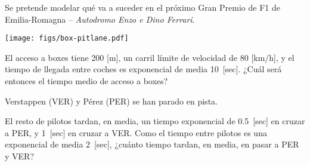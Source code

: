 \documentclass{upmassignment}
\date{\today}
\begin{document}
Se pretende modelar qué va a suceder en
el próximo Gran Premio de F1 de
Emilia-Romagna --
\textit{Autodromo Enzo e Dino Ferrari}.

\vspace{1em}

\begin{minipage}{\textwidth}
    \centering
    \texttt{[image: figs/box-pitlane.pdf]}
\end{minipage}

\begin{problemlist}
    \pbitem El acceso a boxes tiene
    200 [m], un carril
    límite de velocidad de
    80 [km/h], y el tiempo de llegada
    entre coches es exponencial de media
    10~[sec]. ¿Cuál será entonces el tiempo
    medio de acceso a boxes?

    \begin{solucion}
        
    \end{solucion}


    \pbitem Verstappen (VER)
    y Pérez (PER) se han parado en pista.

    \vspace{1em}
    \vspace{1em}

    El resto de pilotos 
    tardan, en media, un tiempo exponencial de
    0.5~[sec] en cruzar a PER, y 1~[sec] en
    cruzar a VER. Como el
    tiempo entre pilotos es una
    exponencial de media 2~[sec], ¿cuánto
    tiempo tardan, en media, en pasar a
    PER y VER?

    \begin{solucion}
        
    \end{solucion}



\end{problemlist}
\end{document}
